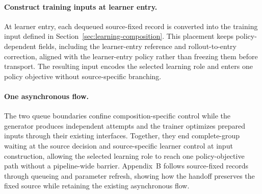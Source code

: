 \documentclass[letterpaper]{article}
\begin{document}
\paragraph{Construct training inputs at learner entry.}
At learner entry, each dequeued source-fixed record is converted into the training input defined in Section~\ref{sec:learning-composition}.
This placement keeps policy-dependent fields, including the learner-entry reference and rollout-to-entry correction, aligned with the learner-entry policy rather than freezing them before transport.
The resulting input encodes the selected learning role and enters one policy objective without source-specific branching.

\paragraph{One asynchronous flow.}
The two queue boundaries confine composition-specific control while the generator produces independent attempts and the trainer optimizes prepared inputs through their existing interfaces.
Together, they end complete-group waiting at the source decision and source-specific learner control at input construction, allowing the selected learning role to reach one policy-objective path without a pipeline-wide barrier.
Appendix~B follows source-fixed records through queueing and parameter refresh, showing how the handoff preserves the fixed source while retaining the existing asynchronous flow.
\end{document}
